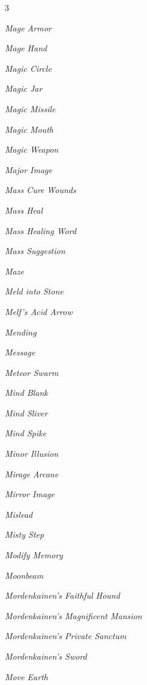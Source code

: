 \documentclass[10pt,a4paper,twoside,bg=print,twocolumn,openany,nodeprecatedcode]{dndbook}
\begin{document}
\begin{description}
\begin{multicols}{3}
\item \textit{Mage Armor}
\item \textit{Mage Hand}
\item \textit{Magic Circle}
\item \textit{Magic Jar}
\item \textit{Magic Missile}
\item \textit{Magic Mouth}
\item \textit{Magic Weapon}
\item \textit{Major Image}
\item \textit{Mass Cure Wounds}
\item \textit{Mass Heal}
\item \textit{Mass Healing Word}
\item \textit{Mass Suggestion}
\item \textit{Maze}
\item \textit{Meld into Stone}
\item \textit{Melf's Acid Arrow}
\item \textit{Mending}
\item \textit{Message}
\item \textit{Meteor Swarm}
\item \textit{Mind Blank}
\item \textit{Mind Sliver}
\item \textit{Mind Spike}
\item \textit{Minor Illusion}
\item \textit{Mirage Arcane}
\item \textit{Mirror Image}
\item \textit{Mislead}
\item \textit{Misty Step}
\item \textit{Modify Memory}
\item \textit{Moonbeam}
\item \textit{Mordenkainen's Faithful Hound}
\item \textit{Mordenkainen's Magnificent Mansion}
\item \textit{Mordenkainen's Private Sanctum}
\item \textit{Mordenkainen's Sword}
\item \textit{Move Earth}
\end{multicols}

\end{description}
\end{document}
